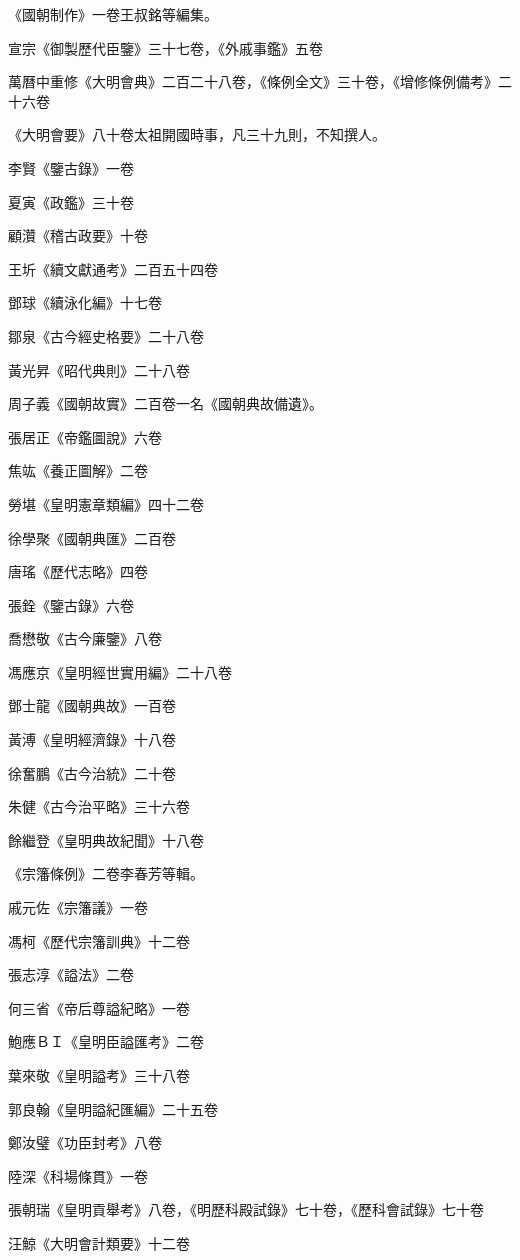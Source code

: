 《國朝制作》一卷王叔銘等編集。

宣宗《御製歷代臣鑒》三十七卷，《外戚事鑑》五卷

萬曆中重修《大明會典》二百二十八卷，《條例全文》三十卷，《增修條例備考》二十六卷

《大明會要》八十卷太祖開國時事，凡三十九則，不知撰人。

李賢《鑒古錄》一卷

夏寅《政鑑》三十卷

顧灒《稽古政要》十卷

王圻《續文獻通考》二百五十四卷

鄧球《續泳化編》十七卷

鄒泉《古今經史格要》二十八卷

黃光昇《昭代典則》二十八卷

周子義《國朝故實》二百卷一名《國朝典故備遺》。

張居正《帝鑑圖說》六卷

焦竑《養正圖解》二卷

勞堪《皇明憲章類編》四十二卷

徐學聚《國朝典匯》二百卷

唐瑤《歷代志略》四卷

張銓《鑒古錄》六卷

喬懋敬《古今廉鑒》八卷

馮應京《皇明經世實用編》二十八卷

鄧士龍《國朝典故》一百卷

黃溥《皇明經濟錄》十八卷

徐奮鵬《古今治統》二十卷

朱健《古今治平略》三十六卷

餘繼登《皇明典故紀聞》十八卷

《宗籓條例》二卷李春芳等輯。

戚元佐《宗籓議》一卷

馮柯《歷代宗籓訓典》十二卷

張志淳《謚法》二卷

何三省《帝后尊謚紀略》一卷

鮑應ＢＩ《皇明臣謚匯考》二卷

葉來敬《皇明謚考》三十八卷

郭良翰《皇明謚紀匯編》二十五卷

鄭汝璧《功臣封考》八卷

陸深《科場條貫》一卷

張朝瑞《皇明貢舉考》八卷，《明歷科殿試錄》七十卷，《歷科會試錄》七十卷

汪鯨《大明會計類要》十二卷

